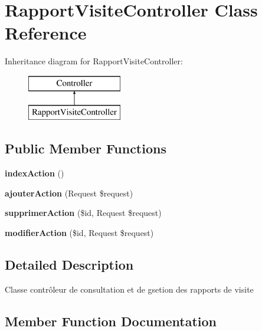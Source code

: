 \section{Rapport\+Visite\+Controller Class Reference}
\label{class_c_r_1_1_g_s_b_r_bundle_1_1_controller_1_1_rapport_visite_controller}
Inheritance diagram for Rapport\+Visite\+Controller\+:\begin{figure}[H]
\begin{center}
\leavevmode
\includegraphics[height=2.000000cm]{class_c_r_1_1_g_s_b_r_bundle_1_1_controller_1_1_rapport_visite_controller}
\end{center}
\end{figure}
\subsection*{Public Member Functions}
\begin{DoxyCompactItemize}
\item 
{\bf index\+Action} ()
\item 
{\bf ajouter\+Action} (Request \$request)
\item 
{\bf supprimer\+Action} (\$id, Request \$request)
\item 
{\bf modifier\+Action} (\$id, Request \$request)
\end{DoxyCompactItemize}


\subsection{Detailed Description}
Classe contrôleur de consultation et de gsetion des rapports de visite 

\subsection{Member Function Documentation}
